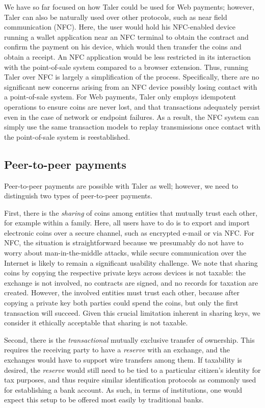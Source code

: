 \documentclass{IEEEtran}
\begin{document}
We have so far focused on how Taler could be used for Web payments;
however, Taler can also be naturally used over other protocols, such
as near field communication (NFC).  Here, the user would hold his
NFC-enabled device running a wallet application near an NFC terminal
to obtain the contract and confirm the payment on his device, which
would then transfer the coins and obtain a receipt.  An NFC
application would be less restricted in its interaction with the
point-of-sale system compared to a browser extension. Thus, running
Taler over NFC is largely a simplification of the process.
Specifically, there are no significant new concerns arising from an
NFC device possibly losing contact with a point-of-sale system.
For Web payments, Taler only employs idempotent operations to
ensure coins are never lost, and that transactions adequately persist
even in the case of network or endpoint failures.  As a result, the
NFC system can simply use the same transaction models to replay
transmissions once contact with the point-of-sale system is
reestablished.


\subsection{Peer-to-peer payments}

Peer-to-peer payments are possible with Taler as well; however,
we need to distinguish two types of peer-to-peer payments.

First, there is the {\em sharing} of coins among entities that
mutually trust each other, for example within a family.  Here, all
users have to do is to export and import electronic coins over a
secure channel, such as encrypted e-mail or via NFC.  For NFC, the
situation is straightforward because we presumably do not have to worry
about man-in-the-middle attacks, while secure communication over the
Internet is likely to remain a significant usability challenge.  We
note that sharing coins by copying the respective private keys across
devices is not taxable: the exchange is not involved, no contracts are
signed, and no records for taxation are created.  However, the
involved entities must trust each other, because after copying a private
key both parties could spend the coins, but only the first transaction
will succeed.  Given this crucial limitation
inherent in sharing keys, we consider it ethically acceptable that
sharing is not taxable.

Second, there is the {\em transactional} mutually exclusive transfer
of ownership.  This requires the receiving party to have a {\em
reserve} with an exchange, and the exchanges would have to support
wire transfers among them.  If taxability is desired, the {\em
reserve} would still need to be tied to a particular citizen's
identity for tax purposes, and thus require similar identification
protocols as commonly used for establishing a bank account.  As such, in
terms of institutions, one would expect this setup to be offered most
easily by traditional banks.
\end{document}
